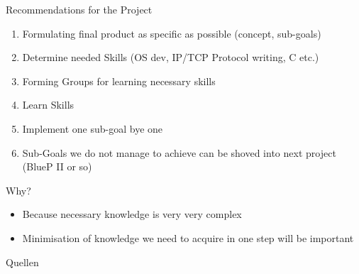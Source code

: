 \documentclass[11pt, aspectratio=169, modernfonts]{beamer}
\theoremstyle{definition}
\theoremstyle{remark}
\begin{document}
\begin{frame}{Recommendations for the Project}
    \begin{enumerate}
        \item Formulating final product as specific as possible (concept, sub-goals)
        \item Determine needed Skills (OS dev, IP/TCP Protocol writing, C etc.)
        \item Forming Groups for learning necessary skills
        \item Learn Skills
        \item Implement one sub-goal bye one
        \item Sub-Goals we do not manage to achieve can be shoved into next project (BlueP II or so)
    \end{enumerate}
    \begin{block}{Why?}
        \begin{itemize}
            \item Because necessary knowledge is very very complex 
            \item Minimisation of knowledge we need to acquire in one step will be important
        \end{itemize}
    \end{block}
\end{frame}

\begin{frame}[allowframebreaks]{Quellen}
    \printbibliography
\end{frame}

\end{document}
